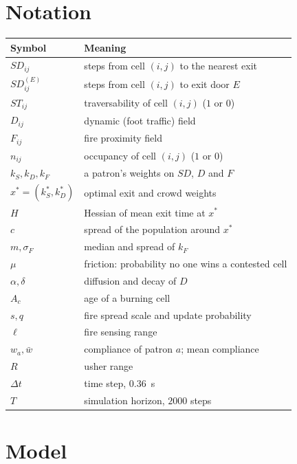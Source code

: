 \documentclass[14pt]{article}
\theoremstyle{definition}
\begin{document}
\section{Notation}
\begin{table}[H]
  \centering
  \small
  \begin{tabular}{ll}
    \toprule
    Symbol & Meaning \\
    \midrule
    $SD_{ij}$ & steps from cell $(i,j)$ to the nearest exit \\
    $SD^{(E)}_{ij}$ & steps from cell $(i,j)$ to exit door $E$ \\
    $ST_{ij}$ & traversability of cell $(i,j)$ ($1$ or $0$) \\
    $D_{ij}$ & dynamic (foot traffic) field \\
    $F_{ij}$ & fire proximity field \\
    $n_{ij}$ & occupancy of cell $(i,j)$ ($1$ or $0$) \\
    $k_S, k_D, k_F$ & a patron's weights on $SD$, $D$ and $F$ \\
    $x^* = (k_S^*, k_D^*)$ & optimal exit and crowd weights \\
    $H$ & Hessian of mean exit time at $x^*$ \\
    $c$ & spread of the population around $x^*$ \\
    $m, \sigma_F$ & median and spread of $k_F$ \\
    $\mu$ & friction: probability no one wins a contested cell \\
    $\alpha, \delta$ & diffusion and decay of $D$ \\
    $A_c$ & age of a burning cell \\
    $s, q$ & fire spread scale and update probability \\
    $\ell$ & fire sensing range \\
    $w_a, \bar w$ & compliance of patron $a$; mean compliance \\
    $R$ & usher range \\
    $\Delta t$ & time step, \SI{0.36}{s} \\
    $T$ & simulation horizon, $2000$ steps \\
    \bottomrule
  \end{tabular}
\end{table}

\newpage
\section{Model}
\end{document}
